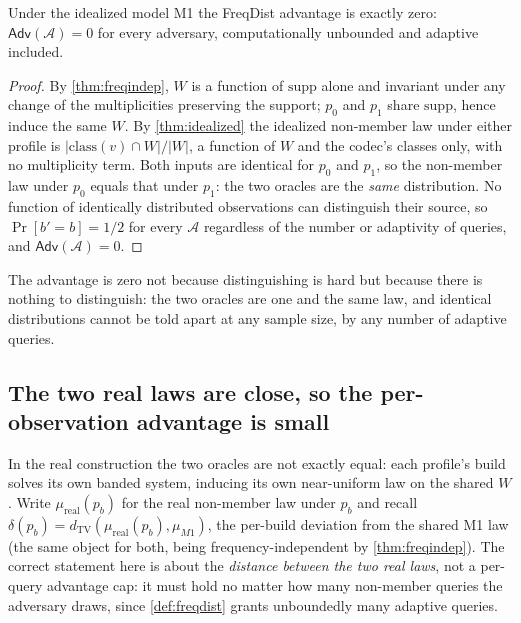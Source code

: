 \documentclass[acmsmall,review]{acmart}
\newcommand{\TV}{d_{\mathrm{TV}}}
\newcommand{\class}{\mathrm{class}}
\newcommand{\W}{W}                          %
\newcommand{\supp}{\mathrm{supp}}           %
\newcommand{\Adv}{\mathsf{Adv}}             %
\newcommand{\lawreal}{\mu_{\mathrm{real}}}  %
\newcommand{\lawM}{\mu_{M1}}                %
\newcommand{\inter}{\cap}
\begin{document}
\begin{theorem}
\label{thm:freqdist-ideal}
Under the idealized model M1 the FreqDist advantage is exactly zero:
$\Adv(\mathcal{A}) = 0$ for every adversary, computationally unbounded and adaptive
included.
\end{theorem}

\begin{proof}
By \cref{thm:freqindep}, $\W$ is a function of $\supp$ alone and invariant under any
change of the multiplicities preserving the support; $p_0$ and $p_1$ share $\supp$, hence
induce the same $\W$. By \cref{thm:idealized} the idealized non-member law under either
profile is $|\class(v) \inter \W|/|\W|$, a function of $\W$ and the codec's classes only,
with no multiplicity term. Both inputs are identical for $p_0$ and $p_1$, so the
non-member law under $p_0$ equals that under $p_1$: the two oracles are the \emph{same}
distribution. No function of identically distributed observations can distinguish their
source, so $\Pr[b' = b] = 1/2$ for every $\mathcal{A}$ regardless of the number or
adaptivity of queries, and $\Adv(\mathcal{A}) = 0$.
\end{proof}

The advantage is zero not because distinguishing is hard but because there is nothing to
distinguish: the two oracles are one and the same law, and identical distributions cannot
be told apart at any sample size, by any number of adaptive queries.

\subsection{The two real laws are close, so the per-observation advantage is small}

In the real construction the two oracles are not exactly equal: each profile's build
solves its own banded system, inducing its own near-uniform law on the shared $\W$. Write
$\lawreal(p_b)$ for the real non-member law under $p_b$ and recall
$\delta(p_b) = \TV(\lawreal(p_b), \lawM)$, the per-build deviation from the shared M1 law
(the same object for both, being frequency-independent by \cref{thm:freqindep}). The
correct statement here is about the \emph{distance between the two real laws}, not a
per-query advantage cap: it must hold no matter how many non-member queries the adversary
draws, since \cref{def:freqdist} grants unboundedly many adaptive queries.
\end{document}
